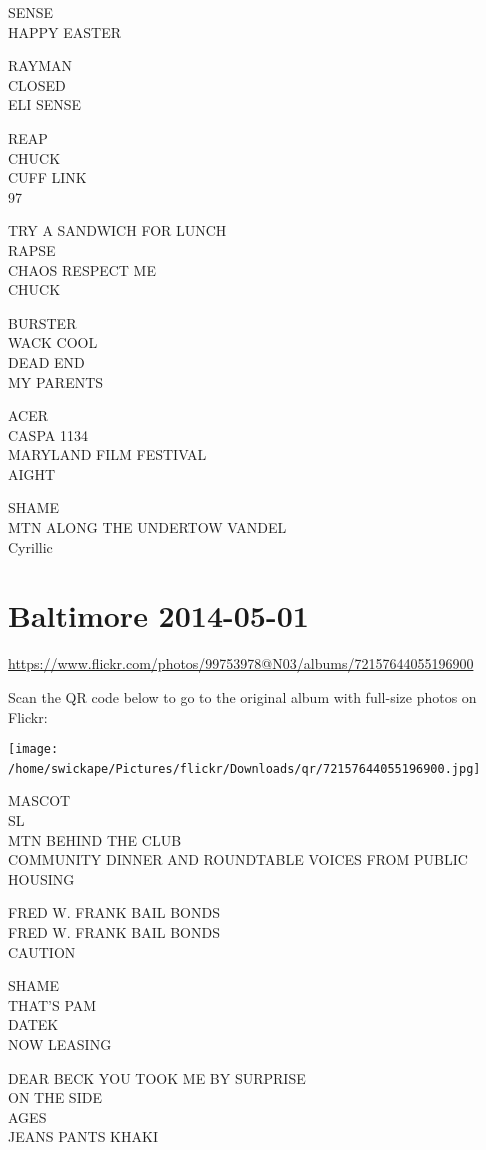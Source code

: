 \documentclass[10pt,letterpaper]{article}
\begin{document}
SENSE\\
HAPPY EASTER

RAYMAN\\
CLOSED\\
ELI SENSE

REAP\\
CHUCK\\
CUFF LINK\\
97

TRY A SANDWICH FOR LUNCH\\
RAPSE\\
CHAOS RESPECT ME\\
CHUCK

BURSTER\\
WACK COOL\\
DEAD END\\
MY PARENTS

ACER\\
CASPA 1134\\
MARYLAND FILM FESTIVAL\\
AIGHT

SHAME\\
MTN ALONG THE UNDERTOW VANDEL\\
Cyrillic
\

\section*{Baltimore 2014-05-01}

\url{https://www.flickr.com/photos/99753978@N03/albums/72157644055196900}

Scan the QR code below to go to the original album with full-size photos on Flickr:

\texttt{[image: /home/swickape/Pictures/flickr/Downloads/qr/72157644055196900.jpg]}
\

MASCOT\\
SL\\
MTN BEHIND THE CLUB\\
COMMUNITY DINNER AND ROUNDTABLE VOICES FROM PUBLIC HOUSING

FRED W. FRANK BAIL BONDS\\
FRED W. FRANK BAIL BONDS\\
CAUTION

SHAME\\
THAT'S PAM\\
DATEK\\
NOW LEASING

DEAR BECK YOU TOOK ME BY SURPRISE\\
ON THE SIDE\\
AGES\\
JEANS PANTS KHAKI
\end{document}
